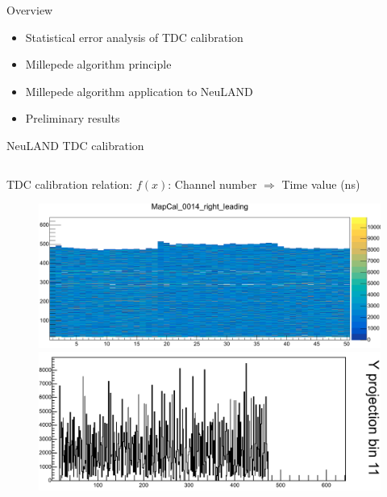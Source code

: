 \documentclass{ikpKoeln}
\date{\scriptsize NeuLAND weekly meeting \\ 05.04.2024}
\begin{document}
\begin{frame}{Overview}
	\begin{itemize}
		\Large
		\setlength\itemsep{2em}
		\item Statistical error analysis of TDC calibration
		\item Millepede algorithm principle
		\item Millepede algorithm application to NeuLAND
		\item Preliminary results
	\end{itemize}
\end{frame}

\begin{frame}[t]{NeuLAND TDC calibration}
	\vspace*{-0.5em}
	\begin{columns}[t]
		\begin{column}{0.45\textwidth}
			\vspace*{-2em}
			\begin{block}{TDC calibration relation:}
				\small
				$f(x)$: Channel number $\Longrightarrow$ Time value (ns)
			\end{block}
			\begin{figure}
				\includegraphics[width = \textwidth]{ neulandMeeting/mapcal_plane_distri.png}
				\vspace*{1em}
				\includegraphics[width = \textwidth]{ neulandMeeting/mapcal_bar_dsistri.png}
			\end{figure}

\end{column}
\end{columns}
\end{frame}
\end{document}
